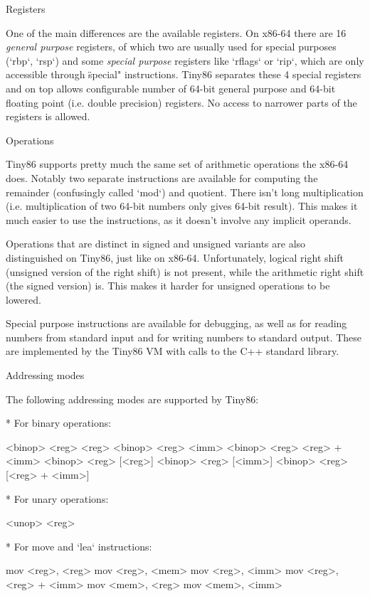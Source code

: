 \secc Registers

One of the main differences are the available registers. On x86-64 there are 16
{\em general purpose} registers, of which two are usually used for special purposes
(`rbp`, `rsp`) and some {\em special purpose} registers like `rflags` or `rip`,
which are only accessible through \"special" instructions. Tiny86 separates these 4
special registers and on top allows configurable number of 64-bit general purpose and
64-bit floating point (i.e. double precision) registers. No access to narrower
parts of the registers is allowed.

\secc Operations

Tiny86 supports pretty much the same set of arithmetic operations the x86-64
does. Notably two separate instructions are available for computing the
remainder (confusingly called `mod`) and quotient. There isn't long
multiplication (i.e. multiplication of two 64-bit numbers only gives 64-bit
result). This makes it much easier to use the instructions, as it doesn't
involve any implicit operands.

Operations that are distinct in signed and unsigned variants are also
distinguished on Tiny86, just like on x86-64. Unfortunately, logical right shift
(unsigned version of the right shift) is not present, while the arithmetic right
shift (the signed version) is. This makes it harder for unsigned operations to
be lowered.

Special purpose instructions are available for debugging, as well as for reading
numbers from standard input and for writing numbers to standard output. These
are implemented by the Tiny86 VM with calls to the C++ standard library.

\secc Addressing modes

The following addressing modes are supported by Tiny86:

\begitems

* For binary operations:

\begtt \optparams
<binop> <reg> <reg>
<binop> <reg> <imm>
<binop> <reg> <reg> + <imm>
<binop> <reg> [<reg>]
<binop> <reg> [<imm>]
<binop> <reg> [<reg> + <imm>]
\endtt

* For unary operations:

\begtt \optparams
<unop> <reg>
\endtt

* For move and `lea` instructions:

\begtt \optparams
mov <reg>, <reg>
mov <reg>, <mem>
mov <reg>, <imm>
mov <reg>, <reg> + <imm>
mov <mem>, <reg>
mov <mem>, <imm>

